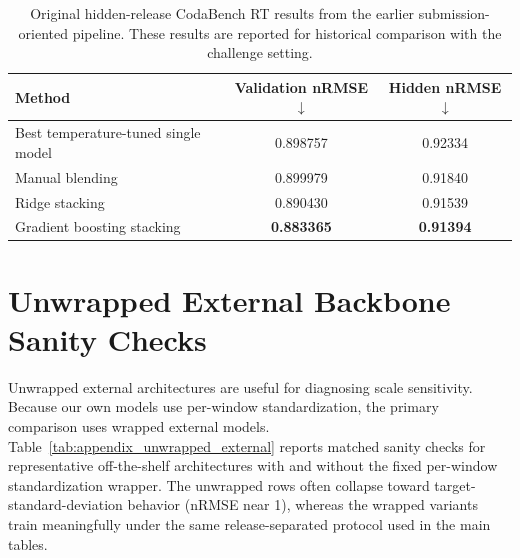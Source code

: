 \documentclass[12pt]{article}
\begin{document}
\begin{table}[!h]
\centering
\caption{Original hidden-release CodaBench RT results from the earlier submission-oriented pipeline. These results are reported for historical comparison with the challenge setting.}
\label{tab:appendix_codabench}
\small
\setlength{\tabcolsep}{8pt}
\renewcommand{\arraystretch}{1.15}
\begin{tabular}{lcc}
\toprule
\textbf{Method} & \textbf{Validation nRMSE} $\downarrow$ & \textbf{Hidden nRMSE} $\downarrow$ \\
\midrule
Best temperature-tuned single model & 0.898757 & 0.92334 \\
Manual blending & 0.899979 & 0.91840 \\
Ridge stacking & 0.890430 & 0.91539 \\
Gradient boosting stacking & \textbf{0.883365} & \textbf{0.91394} \\
\bottomrule
\end{tabular}
\end{table}

\section{Unwrapped External Backbone Sanity Checks}

Unwrapped external architectures are useful for diagnosing scale sensitivity. Because our own models use per-window standardization, the primary comparison uses wrapped external models. Table~\ref{tab:appendix_unwrapped_external} reports matched sanity checks for representative off-the-shelf architectures with and without the fixed per-window standardization wrapper. The unwrapped rows often collapse toward target-standard-deviation behavior (nRMSE near 1), whereas the wrapped variants train meaningfully under the same release-separated protocol used in the main tables.
\end{document}
